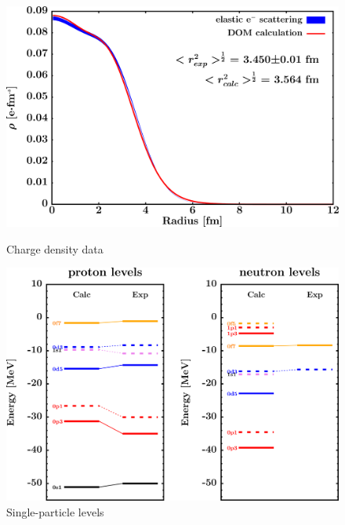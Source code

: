 \begin{figure}[H]
    \centering
    \begin{minipage}{0.45\textwidth}
        \centering
        \includegraphics[width=1.0\textwidth]{figures/ca40_chargeDensity.png}
        \caption{Charge density data}
        \label{DOMFitData_ca40_chargeDensity}
    \end{minipage}\hfill
    \begin{minipage}{0.45\textwidth}
        \centering
        \includegraphics[width=1.0\textwidth]{figures/ca40_SPLevels.png}
        \caption{Single-particle levels}
        \label{DOMFitData_ca40_SPLevels}
    \end{minipage}
\end{figure}

\afterpage{\clearpage}

